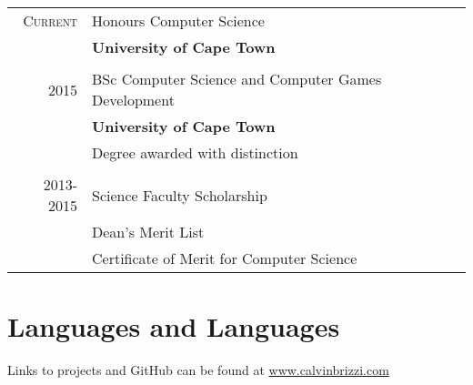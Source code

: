 \documentclass[a4paper,10pt]{article} %
\begin{document}
\begin{tabular}{rl}
\textsc{Current} & Honours Computer Science\\
& \textbf{University of Cape Town}\\
&\\

\textsc{2015} & BSc Computer Science and Computer Games Development\\
& \textbf{University of Cape Town}\\
& Degree awarded with distinction\\
&\\





\textsc{2013-2015} & Science Faculty Scholarship\\
& Dean's Merit List\\
& Certificate of Merit for Computer Science\\


\end{tabular}


\section{Languages and Languages}
Links to projects and GitHub can be found at \href{www.calvinbrizzi.com}{www.calvinbrizzi.com}
\end{document}
